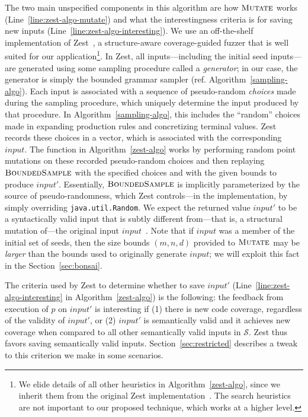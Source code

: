 \documentclass[conference]{IEEEtran}
\newcommand{\code}{\texttt}
\begin{document}
The two main unspecified components in this algorithm are how $\textproc{Mutate}$ works (Line~\ref{line:zest-algo-mutate}) and what the interestingness criteria is for saving new inputs  (Line~\ref{line:zest-algo-interesting}). We use an off-the-shelf implementation of Zest~\cite{Padhye19-zest}, a structure-aware coverage-guided fuzzer that is well suited for our application\footnote{We elide details of all other heuristics in Algorithm~\ref{zest-algo}, since we inherit them from the original Zest implementation~\cite{Padhye19-zest}. The search heuristics are not important to our proposed technique, which works at a higher level.}. In Zest, all inputs---including the initial seed inputs---are generated using some sampling procedure called a \emph{generator}; in our case, the generator is simply the bounded grammar sampler (ref. Algorithm~\ref{sampling-algo}). Each input is associated with a sequence of pseudo-random \emph{choices} made during the sampling procedure, which uniquely determine the input produced by that procedure. In Algorithm~\ref{sampling-algo}, this includes the ``random'' choices made in expanding production rules and concretizing terminal values. Zest records these choices in a vector, which is associated with the corresponding $input$. The  function in Algorithm~\ref{zest-algo} works by performing random point mutations on these recorded pseudo-random choices and then replaying $\textproc{BoundedSample}$ with the specified choices and with the given bounds to produce $input'$. Essentially,  $\textproc{BoundedSample}$ is implicitly parameterized by the source of pseudo-randomness, which Zest controls---in the implementation, by simply overriding \code{java.util.Random}. We expect the returned value $input'$ to be a syntactically valid input that is subtly different from---that is, a structural mutation of---the original input $input$~\cite{Padhye19-zest}. Note that if $input$ was a member of the initial set of seeds, then the size bounds $(m,n,d)$ provided to $\textproc{Mutate}$ may be \emph{larger} than the bounds used to originally generate $input$; we will exploit this fact in the Section~\ref{sec:bonsai}. 

The criteria used by Zest to determine whether to save $input'$ (Line~\ref{line:zest-algo-interesting} in Algorithm~\ref{zest-algo}) is the following: the feedback from execution of $p$ on $input'$ is interesting if (1) there is new code coverage, regardless of the validity of $input'$, or (2) $input'$ is semantically valid and it achieves new coverage when compared to all other semantically valid inputs in $\mathcal{S}$. Zest thus favors saving semantically valid inputs. Section~\ref{sec:restricted} describes a tweak to this criterion we make in some scenarios.
\end{document}

